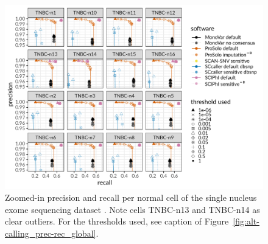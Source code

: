 \documentclass[authoryear,preprint,11pt]{scrartcl}
\begin{document}
\begin{figure}[!tpb]
 \begin{minipage}{\linewidth}
  \includegraphics[width=\linewidth]{figs/Wang2014/Wang2014_prosolo-monovar-scansnv-sccaller-scvilp_per-cell_precision-recall-plot_focus-tools_normal.pdf} \newline
 \end{minipage}
 \caption{
  Zoomed-in precision and recall per normal cell of the single nucleus exome sequencing dataset \cite{wang_clonal_2014}.
  Note cells TNBC-n13 and TNBC-n14 as clear outliers.\newline \footnotesize
  For the thresholds used, see caption of Figure~\ref{fig:alt-calling_prec-rec_global}.
  }
 \label{fig:wang_alt-calling_prec-rec_per-cell_normal}
\end{figure}
\end{document}
